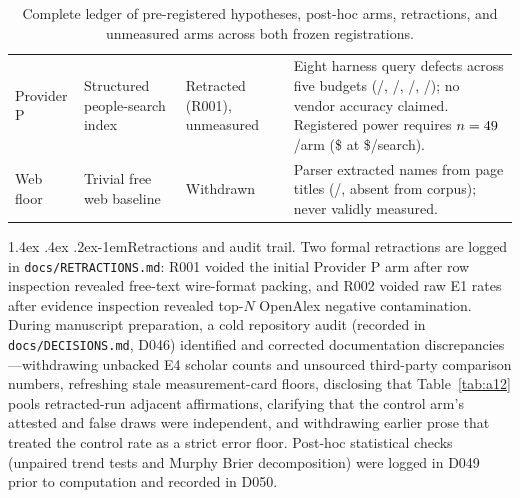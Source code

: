 \documentclass[11pt]{article}
\makeatletter
\renewcommand\paragraph{\@startsection{paragraph}{4}{\z@}%
  {1.4ex \@plus .4ex \@minus .2ex}{-1em}{\normalfont\normalsize\bfseries}}
\makeatother
\begin{document}
\begin{table}[!htb]
\begin{tabularx}{\linewidth}{@{}l>{\raggedright\arraybackslash}p{2.7cm}>{\raggedright\arraybackslash}p{2.3cm}>{\raggedright\arraybackslash}X@{}}
Provider P & Structured people-search index & Retracted (R001), unmeasured & Eight harness query defects across five budgets (\tiPRunOneCorrect{}/\tiPRunOneN{}, \tiPRunTwoCorrect{}/\tiPRunTwoN{}, \tiPRunFourCorrect{}/\tiPRunFourN{}, \tiPRunArmCorrect{}/\tiPRunArmN{}); no vendor accuracy claimed. Registered power requires $n=49{}$/arm (\$\tiPowerCost{} at \$\tiPowerPrice{}/search). \\
Web floor & Trivial free web baseline & Withdrawn & Parser extracted names from page titles (\tiWebCorrect{}/\tiWebN{}, \tiWebNotInCorpus{} absent from corpus); never validly measured. \\
\bottomrule
\end{tabularx}
\caption{Complete ledger of pre-registered hypotheses, post-hoc arms, retractions, and unmeasured arms across both frozen registrations.}
\label{tab:prereg}
\end{table}

\paragraph{Retractions and audit trail.}
Two formal retractions are logged in \texttt{docs/RETRACTIONS.md}: R001 voided the initial Provider P arm after row inspection revealed free-text wire-format packing, and R002 voided raw E1 rates after evidence inspection revealed top-$N$ OpenAlex negative contamination. During manuscript preparation, a cold repository audit (recorded in \texttt{docs/DECISIONS.md}, D046) identified and corrected documentation discrepancies---withdrawing unbacked E4 scholar counts and unsourced third-party comparison numbers, refreshing stale measurement-card floors, disclosing that Table~\ref{tab:a12} pools retracted-run adjacent affirmations, clarifying that the control arm's attested and false draws were independent, and withdrawing earlier prose that treated the \tiCtlRate{} control rate as a strict error floor. Post-hoc statistical checks (unpaired trend tests and Murphy Brier decomposition) were logged in D049 prior to computation and recorded in D050.
\end{document}
